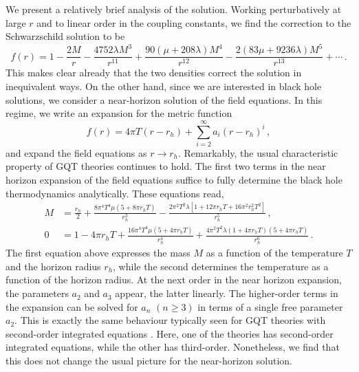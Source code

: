 \documentclass[11pt]{article}
\newcommand{\be}{\begin{equation}}
\newcommand{\ee}{\end{equation} }
\begin{document}
{We present a relatively brief analysis of the solution. Working perturbatively at large $r$ and to linear order in the coupling constants, we find the correction to the Schwarzschild solution to be
\be 
f(r) = 1 - \frac{2M}{r} - \frac{4752 \lambda M^3 }{r^{11}}  + \frac{ 90 (\mu + 208 \lambda) M^4}{r^{12}} - \frac{2 (83 \mu + 9236 \lambda ) M^5 }{r^{13}} + \cdots \, .
\ee
This makes clear already that the two densities correct the solution in inequivalent ways. On the other hand, since we are interested in black hole solutions, we consider a near-horizon solution of the field equations. In this regime, we write an expansion for the metric function
\be 
f(r) = 4 \pi T (r-r_h) + \sum_{i=2}^\infty a_i (r-r_h)^i \, ,
\ee
and expand the field equations as $r \to r_h$. Remarkably, the usual characteristic property of GQT theories continues to hold. The first two terms in the near horizon expansion of the field equations suffice to fully determine the black hole thermodynamics analytically. These equations read,
\begin{align}
M &= \frac{r_h}{2}  + \frac{8 \pi^4 T^4 \mu \left(5 + 8 \pi  r_h T  \right)}{r_h^3} - \frac{2 \pi^2 T^2 \lambda \left[1 + 12 \pi r_h T + 16 \pi^2 r_h^2 T^2 \right]}{r_h^5} \, ,
\\
0 &= 1 - 4 \pi r_h T + \frac{16 \pi^4 T^4 \mu \left(5 + 4 \pi  r_h T  \right)}{r_h^4} + \frac{4 \pi^2 T^2 \lambda  \left(1 + 4 \pi r_h T \right) \left(5 + 4 \pi r_h T \right)}{r_h^6} \, .
\label{thermo_eqns}
\end{align}
The first equation above expresses the mass $M$ as a function of the temperature $T$ and the horizon radius $r_h$, while the second determines the temperature as a function of the horizon radius.  At the next order in the near horizon expansion, the parameters $a_2$ and $a_3$ appear, the latter linearly. The higher-order terms in the expansion can be solved for $a_n$ $(n \ge 3)$ in terms of a single free parameter $a_2$. This is exactly the same behaviour typically seen for GQT theories with second-order integrated equations \cite{PabloPablo2,Hennigar:2017ego,PabloPablo4}. Here, one of the theories has second-order integrated equations, while the other has third-order. Nonetheless, we find that this does not change the usual picture for the near-horizon solution.



}
\end{document}
